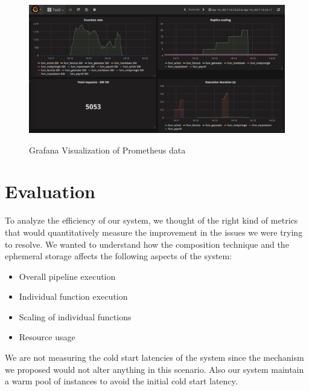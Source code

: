 \documentclass[12pt,titlepage]{article}
\begin{document}
\begin{figure}[!h]
    \caption{Grafana Visualization of Prometheus data}
    \centering
    \includegraphics[width=150mm]{./thesis_images/monitoring.jpeg}
    \label{fig:monitoring}
\end{figure}

\section{Evaluation}
\label{sec:org75a97b7}
To analyze the efficiency of our system, we thought of the right kind of metrics
that would quantitatively measure the improvement in the issues we were trying
to resolve. We wanted to understand how the composition technique and the
ephemeral storage affects the following aspects of the system:
\begin{itemize}
\item Overall pipeline execution
\item Individual function execution
\item Scaling of individual functions
\item Resource usage
\end{itemize}

We are not measuring the cold start latencies of the system since the mechanism
we proposed would not alter anything in this scenario. Also our system 
maintain a warm pool of instances to avoid the initial cold start latency.  
\end{document}
